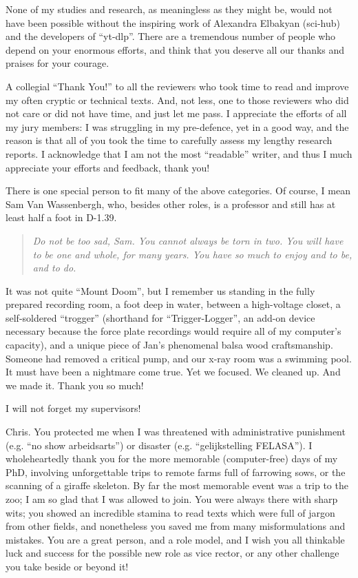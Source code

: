 \bigskip
None of my studies and research, as meaningless as they might be, would not have been possible without the inspiring work of Alexandra Elbakyan (sci-hub) and the developers of ``yt-dlp''.
There are a tremendous number of people who depend on your enormous efforts, and think that you deserve all our thanks and praises for your courage.


\bigskip
A collegial ``Thank You!'' to all the reviewers who took time to read and improve my often cryptic or technical texts.
And, not less, one to those reviewers who did not care or did not have time, and just let me pass.
I appreciate the efforts of all my jury members: I was struggling in my pre-defence, yet in a good way, and the reason is that all of you took the time to carefully assess my lengthy research reports.
I acknowledge that I am not the most ``readable'' writer, and thus I much appreciate your efforts and feedback, thank you!



\bigskip
There is one special person to fit many of the above categories.
Of course, I mean Sam Van Wassenbergh, who, besides other roles, is a professor and still has at least half a foot in D-1.39.
\begin{quote}
\textit{Do not be too sad, Sam.
You cannot always be torn in two.
You will have to be one and whole, for many years.
You have so much to enjoy and to be, and to do. }
\end{quote}
It was not quite ``Mount Doom'', but I remember us standing in the fully prepared recording room, a foot deep in water, between a high-voltage closet, a self-soldered ``trogger'' (shorthand for ``Trigger-Logger'', an add-on device necessary because the force plate recordings would require all of my computer's capacity), and a unique piece of Jan's phenomenal balsa wood craftsmanship.
Someone had removed a critical pump, and our x-ray room was a swimming pool.
It must have been a nightmare come true.
Yet we focused. We cleaned up. And we made it.
Thank you so much!


\bigskip
I will not forget my supervisors!

Chris.
You protected me when I was threatened with administrative punishment (e.g. ``no show arbeidsarts'') or disaster (e.g. ``gelijkstelling FELASA'').
I wholeheartedly thank you for the more memorable (computer-free) days of my PhD, involving unforgettable trips to remote farms full of farrowing sows, or the scanning of a giraffe skeleton.
By far the most memorable event was a trip to the zoo; I am so glad that I was allowed to join.
You were always there with sharp wits; you showed an incredible stamina to read texts which were full of jargon from other fields, and nonetheless you saved me from many misformulations and mistakes.
You are a great person, and a role model, and I wish you all thinkable luck and success for the possible new role as vice rector, or any other challenge you take beside or beyond it!

